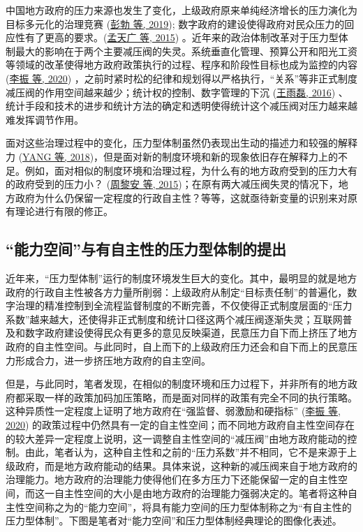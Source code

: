 \documentclass[
  12pt,
]{ctexart}
\begin{document}
中国地方政府的压力来源也发生了变化，上级政府原来单纯经济增长的压力演化为目标多元化的治理竞赛 (\protect\hyperlink{ref-PengBoZhaoJi2019}{彭勃 等, 2019}); 数字政府的建设使得政府对民众压力的回应性有了更高的要求。(\protect\hyperlink{ref-MengTianGuangLiFeng2015}{孟天广 等, 2015}) 。近年来的政治体制改革对于压力型体制最大的影响在于两个主要减压阀的失灵。系统垂直化管理、预算公开和阳光工资等领域的改革使得地方政府政策执行的过程、程序和阶段性目标也成为监控的内容 (\protect\hyperlink{ref-LiZhenEtAl2020c}{李振 等, 2020}) ，之前时紧时松的纪律和规划得以严格执行，``关系''等非正式制度减压阀的作用空间越来越少；统计权的控制、数字管理的下沉 (\protect\hyperlink{ref-WangYuLei2016}{王雨磊, 2016}) 、统计手段和技术的进步和统计方法的确定和透明使得统计这个减压阀对压力越来越难发挥调节作用。

面对这些治理过程中的变化，压力型体制虽然仍表现出生动的描述力和较强的解释力 (\protect\hyperlink{ref-YangYan2018}{YANG 等, 2018})，但是面对新的制度环境和新的现象依旧存在解释力上的不足。例如，面对相似的制度环境和治理过程，为什么有的地方政府受到的压力大有的政府受到的压力小？ (\protect\hyperlink{ref-ZhouLiAnEtAl2015}{周黎安 等, 2015})；在原有两大减压阀失灵的情况下，地方政府为什么仍保留一定程度的行政自主性？等等，这就亟待新变量的识别来对原有理论进行有限的修正。

\hypertarget{ux80fdux529bux7a7aux95f4ux4e0eux6709ux81eaux4e3bux6027ux7684ux538bux529bux578bux4f53ux5236ux7684ux63d0ux51fa}{%
\subsection{``能力空间''与有自主性的压力型体制的提出}\label{ux80fdux529bux7a7aux95f4ux4e0eux6709ux81eaux4e3bux6027ux7684ux538bux529bux578bux4f53ux5236ux7684ux63d0ux51fa}}

近年来，``压力型体制''运行的制度环境发生巨大的变化。其中，最明显的就是地方政府的行政自主性被各方力量所削弱：上级政府从制定``目标责任制''的普遍化，数字治理的精准控制到全流程监督制度的不断完善，不仅使得正式制度层面的``压力系数''越来越大，还使得非正式制度和统计口径这两个减压阀逐渐失灵；互联网普及和数字政府建设使得民众有更多的意见反映渠道，民意压力自下而上挤压了地方政府的自主性空间。与此同时，自上而下的上级政府压力还会和自下而上的民意压力形成合力，进一步挤压地方政府的自主空间。

但是，与此同时，笔者发现，在相似的制度环境和压力过程下，并非所有的地方政府都采取一样的政策加码加压策略，而是面对同样的政策有完全不同的执行策略。这种异质性一定程度上证明了地方政府在``强监督、弱激励和硬指标'' (\protect\hyperlink{ref-LiZhenEtAl2020c}{李振 等, 2020}) 的政策过程中仍然具有一定的自主性空间；而不同地方政府自主性空间存在的较大差异一定程度上说明，这一调整自主性空间的``减压阀''由地方政府能动的控制。由此，笔者认为，这种自主性和之前的``压力系数''并不相同，它不是来源于上级政府，而是地方政府能动的结果。具体来说，这种新的减压阀来自于地方政府的治理能力。地方政府的治理能力使得他们在多方压力下还能保留一定的自主性空间，而这一自主性空间的大小是由地方政府的治理能力强弱决定的。笔者将这种自主性空间称之为的``能力空间''，将具有能力空间的压力型体制称之为``有自主性的压力型体制''。下图是笔者对``能力空间''和压力型体制经典理论的图像化表述。
\end{document}
